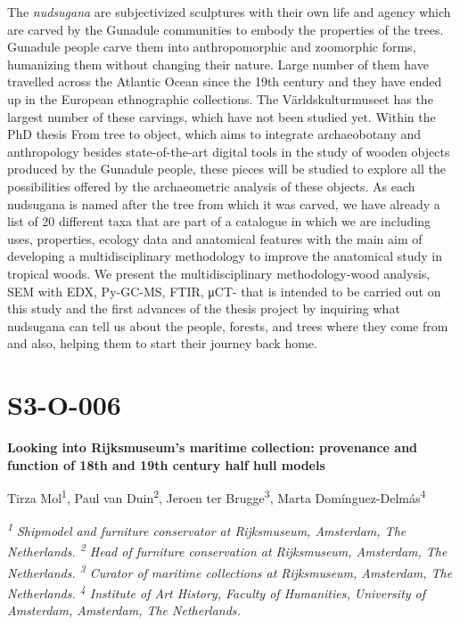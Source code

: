 \documentclass[
]{book}
\begin{document}
The \emph{nudsugana} are subjectivized sculptures with their own life and agency which are carved by the Gunadule communities to embody the properties of the trees. Gunadule people carve them into anthropomorphic and zoomorphic forms, humanizing them without changing their nature. Large number of them have travelled across the Atlantic Ocean since the 19th century and they have ended up in the European ethnographic collections. The Världskulturmuseet has the largest number of these carvings, which have not been studied yet. Within the PhD thesis From tree to object, which aims to integrate archaeobotany and anthropology besides state-of-the-art digital tools in the study of wooden objects produced by the Gunadule people, these pieces will be studied to explore all the possibilities offered by the archaeometric analysis of these objects. As each nudsugana is named after the tree from which it was carved, we have already a list of 20 different taxa that are part of a catalogue in which we are including uses, properties, ecology data and anatomical features with the main aim of developing a multidisciplinary methodology to improve the anatomical study in tropical woods. We present the multidisciplinary methodology-wood analysis, SEM with EDX, Py-GC-MS, FTIR, μCT- that is intended to be carried out on this study and the first advances of the thesis project by inquiring what nudsugana can tell us about the people, forests, and trees where they come from and also, helping them to start their journey back home.

\hypertarget{s3-o-006}{%
\section*{S3-O-006}\label{s3-o-006}}

\textbf{Looking into Rijksmuseum's maritime collection: provenance and function of 18th and 19th century half hull models}

Tirza Mol\textsuperscript{1}, Paul van Duin\textsuperscript{2}, Jeroen ter Brugge\textsuperscript{3}, Marta Domínguez-Delmás\textsuperscript{4}

\emph{\textsuperscript{1} Shipmodel and furniture conservator at Rijksmuseum, Amsterdam, The Netherlands. \textsuperscript{2} Head of furniture conservation at Rijksmuseum, Amsterdam, The Netherlands. \textsuperscript{3} Curator of maritime collections at Rijksmuseum, Amsterdam, The Netherlands. \textsuperscript{4} Institute of Art History, Faculty of Humanities, University of Amsterdam, Amsterdam, The Netherlands.}
\end{document}
